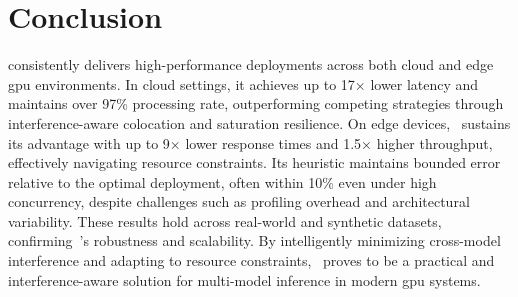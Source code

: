 \section{Conclusion}\label{sec:conclusion}

\roomie{} consistently delivers high-performance deployments across both cloud and edge \acrshort{gpu} environments. In cloud settings, it achieves up to 17× lower latency and maintains over 97\% processing rate, outperforming competing strategies through interference-aware colocation and saturation resilience. On edge devices,~\roomie{} sustains its advantage with up to 9× lower response times and 1.5× higher throughput, effectively navigating resource constraints. Its heuristic maintains bounded error relative to the optimal deployment, often within 10\% even under high concurrency, despite challenges such as profiling overhead and architectural variability. These results hold across real-world and synthetic datasets, confirming~\roomie{}'s robustness and scalability. By intelligently minimizing cross-model interference and adapting to resource constraints,~\roomie{} proves to be a practical and interference-aware solution for multi-model inference in modern \acrshort{gpu} systems.
